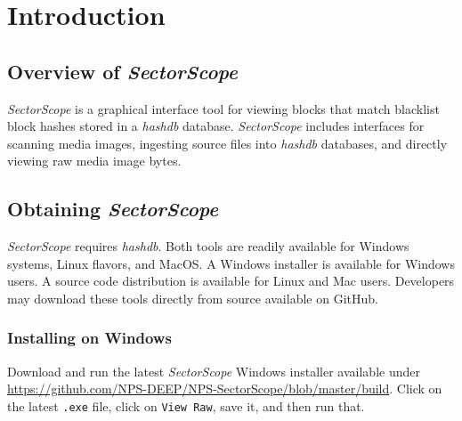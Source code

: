 \documentclass[11pt,fleqn]{article} %
\begin{document}
\newcommand \sscope {\textit{SectorScope}\xspace}
\newcommand \hdb {\textit{hashdb}\xspace}
\newcommand \aut {\textit{Autopsy}\xspace}
\newcommand \bulk {\textbf{bulk\_extractor}\xspace}
\newcommand \mdd {\textbf{md5deep}\xspace}
\newcommand \fiwalk {\textbf{fiwalk}\xspace}





\setlength{\parindent}{0pt} %
\newpage
\thispagestyle{empty}
\mbox{}
\newpage


\section{Introduction}
\subsection {Overview of \sscope}
\sscope is a graphical interface tool for viewing blocks that match blacklist block hashes stored in a \hdb database. \sscope includes interfaces for scanning media images, ingesting source files into \hdb databases, and directly viewing raw media image bytes.\\

\subsection{Obtaining \sscope}
\label{Obtaining}
\sscope requires \hdb. Both tools are readily available for Windows systems, Linux flavors, and MacOS.  A Windows installer is available for Windows users.  A source code distribution is available for Linux and Mac users.  Developers may download these tools directly from source available on GitHub.\\

\subsubsection{Installing on Windows}
Download and run the latest \sscope Windows installer available under \url{https://github.com/NPS-DEEP/NPS-SectorScope/blob/master/build}. Click on the latest \verb+.exe+ file, click on \verb+View Raw+, save it, and then run that.\\
\end{document}

